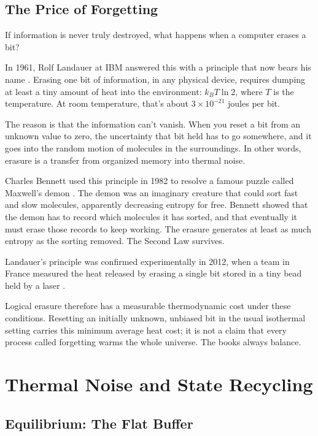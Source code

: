 \subsection{The Price of Forgetting}

If information is never truly destroyed, what happens when a computer erases a bit?

In 1961, Rolf Landauer at IBM answered this with a principle that now bears his name \cite{landauer1961}. Erasing one bit of information, in any physical device, requires dumping at least a tiny amount of heat into the environment: \(k_B T \ln 2\), where \(T\) is the temperature. At room temperature, that's about \(3 \times 10^{-21}\) joules per bit.

The reason is that the information can't vanish. When you reset a bit from an unknown value to zero, the uncertainty that bit held has to go somewhere, and it goes into the random motion of molecules in the surroundings. In other words, erasure is a transfer from organized memory into thermal noise.

Charles Bennett used this principle in 1982 to resolve a famous puzzle called Maxwell's demon \cite{bennett1982}. The demon was an imaginary creature that could sort fast and slow molecules, apparently decreasing entropy for free. Bennett showed that the demon has to record which molecules it has sorted, and that eventually it must erase those records to keep working. The erasure generates at least as much entropy as the sorting removed. The Second Law survives.

Landauer's principle was confirmed experimentally in 2012, when a team in France measured the heat released by erasing a single bit stored in a tiny bead held by a laser \cite{berut2012}.

Logical erasure therefore has a measurable thermodynamic cost under these conditions. Resetting an initially unknown, unbiased bit in the usual isothermal setting carries this minimum average heat cost; it is not a claim that every process called forgetting warms the whole universe. The books always balance.

\section{Thermal Noise and State Recycling}

\subsection{Equilibrium: The Flat Buffer}


